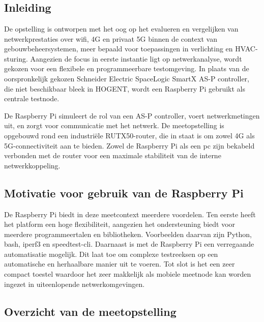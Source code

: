 \chapter{}%
\label{ch:basisopstelling}

\section{Inleiding}

De opstelling is ontworpen met het oog op het evalueren en vergelijken van netwerkprestaties over wifi, 4G en privaat 5G binnen de context van gebouwbeheersystemen, meer bepaald voor toepassingen in verlichting en HVAC-sturing.
Aangezien de focus in eerste instantie ligt op netwerkanalyse, wordt gekozen voor een flexibele en programmeerbare testomgeving. In plaats van de oorspronkelijk gekozen Schneider Electric SpaceLogic SmartX AS-P controller, die niet beschikbaar bleek in HOGENT, wordt een Raspberry Pi gebruikt als centrale testnode.

De Raspberry Pi simuleert de rol van een AS-P controller,  voert netwerkmetingen uit, en zorgt voor communicatie met het netwerk. De meetopstelling is opgebouwd rond een industriële RUTX50-router, die in staat is om zowel 4G als 5G-connectiviteit aan te bieden. Zowel de Raspberry Pi als een pc zijn bekabeld verbonden met de router voor een maximale stabiliteit van de interne netwerkkoppeling.


\section{Motivatie voor gebruik van de Raspberry Pi}

De Raspberry Pi biedt in deze meetcontext meerdere voordelen. Ten eerste heeft het platform een hoge flexibiliteit, aangezien het ondersteuning biedt voor meerdere programmeertalen en bibliotheken. Voorbeelden daarvan zijn Python, bash, iperf3 en speedtest-cli. Daarnaast is met de Raspberry Pi een verregaande automatisatie mogelijk. Dit laat toe om complexe testreeksen op een automatische en herhaalbare manier uit te voeren. Tot slot is het een zeer compact toestel waardoor het zeer makkelijk als mobiele meetnode kan worden ingezet in uiteenlopende netwerkomgevingen.


\section{Overzicht van de meetopstelling}

